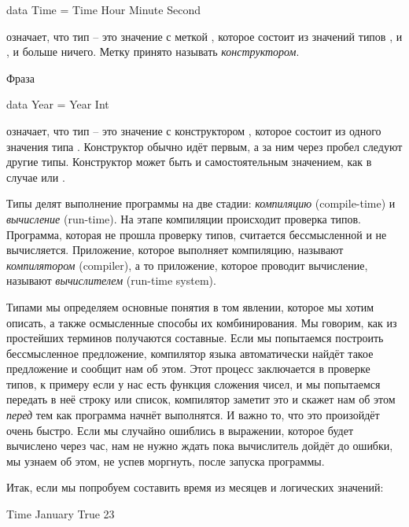 \begin{code}
data Time = Time Hour Minute Second
\end{code}

\noindent означает, что тип  -- это значение с меткой ,
которое состоит из значений типов ,  и 
, и больше ничего. Метку принято называть 
\emph{конструктором}.

Фраза

\begin{code}
data Year = Year Int
\end{code}

\noindent означает, что тип  -- это значение с 
конструктором ,
которое состоит из одного значения типа .
Конструктор обычно идёт первым, а за ним через пробел следуют 
другие типы. Конструктор может быть и самостоятельным значением,
как в случае  или .

Типы делят выполнение программы на две стадии: \emph{компиляцию}
(compile-time) и \emph{вычисление} (run-time). На этапе 
компиляции происходит проверка типов. Программа, которая
не прошла проверку типов, считается бессмысленной и не
вычисляется. Приложение, которое выполняет компиляцию,
называют 
\emph{компилятором} (compiler), а то приложение, которое 
проводит вычисление, называют \emph{вычислителем} (run-time system).

Типами мы определяем основные понятия в том явлении,
которое мы хотим описать, а также осмысленные способы
их комбинирования. Мы говорим, как из простейших терминов
получаются составные. 
Если мы попытаемся построить 
бессмысленное предложение, компилятор языка автоматически 
найдёт такое предложение и сообщит нам об этом. 
Этот процесс заключается в проверке
типов, к примеру если у нас есть функция сложения чисел, и 
мы попытаемся передать в неё строку или список, компилятор
заметит это и скажет нам об этом \emph{перед} тем как программа
начнёт выполнятся. И важно то, что это произойдёт очень быстро.
Если мы случайно ошиблись в выражении, которое будет вычислено
через час, нам не нужно ждать пока вычислитель дойдёт до ошибки, мы
узнаем об этом, не успев моргнуть, после запуска программы.

Итак, если мы попробуем составить время из месяцев и логических
значений:

\begin{code}
Time January True 23
\end{code}

